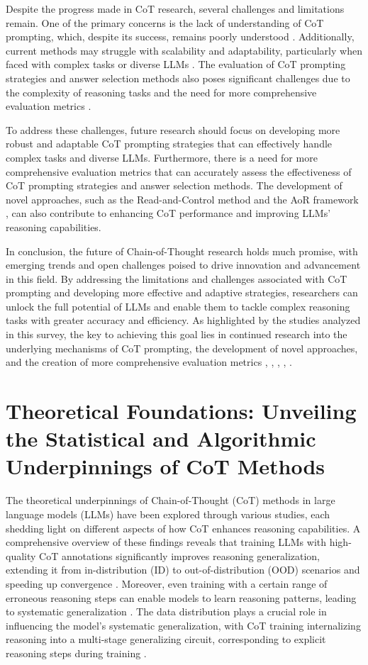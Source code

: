 \documentclass[conference]{IEEEtran}
\begin{document}
Despite the progress made in CoT research, several challenges and limitations remain. One of the primary concerns is the lack of understanding of CoT prompting, which, despite its success, remains poorly understood \cite{b1}. Additionally, current methods may struggle with scalability and adaptability, particularly when faced with complex tasks or diverse LLMs \cite{b3}. The evaluation of CoT prompting strategies and answer selection methods also poses significant challenges due to the complexity of reasoning tasks and the need for more comprehensive evaluation metrics \cite{b4}.

To address these challenges, future research should focus on developing more robust and adaptable CoT prompting strategies that can effectively handle complex tasks and diverse LLMs. Furthermore, there is a need for more comprehensive evaluation metrics that can accurately assess the effectiveness of CoT prompting strategies and answer selection methods. The development of novel approaches, such as the Read-and-Control method \cite{b2} and the AoR framework \cite{b4}, can also contribute to enhancing CoT performance and improving LLMs' reasoning capabilities.

In conclusion, the future of Chain-of-Thought research holds much promise, with emerging trends and open challenges poised to drive innovation and advancement in this field. By addressing the limitations and challenges associated with CoT prompting and developing more effective and adaptive strategies, researchers can unlock the full potential of LLMs and enable them to tackle complex reasoning tasks with greater accuracy and efficiency. As highlighted by the studies analyzed in this survey, the key to achieving this goal lies in continued research into the underlying mechanisms of CoT prompting, the development of novel approaches, and the creation of more comprehensive evaluation metrics \cite{b1}, \cite{b2}, \cite{b3}, \cite{b4}, \cite{b5}.

\section{Theoretical Foundations: Unveiling the Statistical and Algorithmic Underpinnings of CoT Methods}
The theoretical underpinnings of Chain-of-Thought (CoT) methods in large language models (LLMs) have been explored through various studies, each shedding light on different aspects of how CoT enhances reasoning capabilities. A comprehensive overview of these findings reveals that training LLMs with high-quality CoT annotations significantly improves reasoning generalization, extending it from in-distribution (ID) to out-of-distribution (OOD) scenarios and speeding up convergence \cite{b1}. Moreover, even training with a certain range of erroneous reasoning steps can enable models to learn reasoning patterns, leading to systematic generalization \cite{b1}. The data distribution plays a crucial role in influencing the model's systematic generalization, with CoT training internalizing reasoning into a multi-stage generalizing circuit, corresponding to explicit reasoning steps during training \cite{b1}.
\end{document}
